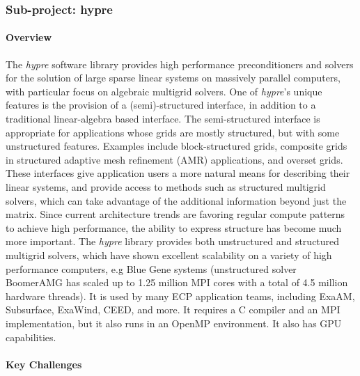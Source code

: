 \subsubsection{ Sub-project: hypre}

\paragraph{Overview}
The {\sl hypre} software library \cite{hypre:homepage,hypre_design_impl_2006} provides high performance preconditioners and solvers for the solution of large sparse linear systems on massively parallel computers, with particular focus on algebraic multigrid solvers. One of {\sl hypre}’s unique features is the provision of a (semi)-structured interface, in addition to a traditional linear-algebra based interface. The semi-structured interface is appropriate for applications whose grids are mostly structured, but with some unstructured features. Examples include block-structured grids, composite grids in structured adaptive mesh refinement (AMR) applications, and overset grids. These interfaces give application users a more natural means for describing their linear systems, and provide access to methods such as structured multigrid solvers, which can take advantage of the additional information beyond just the matrix. Since current architecture trends are favoring regular compute patterns to achieve high performance, the ability to express structure has become much more important. The {\sl hypre} library provides both unstructured and structured multigrid solvers, which have shown excellent scalability on a variety of high performance computers, e.g Blue Gene systems (unstructured solver BoomerAMG has scaled up to 1.25 million MPI cores with a total of 4.5 million hardware threads). It is used by many ECP application teams, including ExaAM, Subsurface, ExaWind, CEED, and more. It requires a C compiler and an MPI implementation, but it also runs in an OpenMP environment. It also has GPU capabilities.

\paragraph{Key  Challenges}


